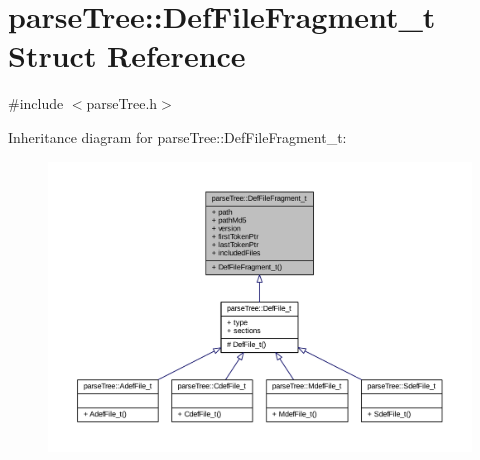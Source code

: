 \hypertarget{structparse_tree_1_1_def_file_fragment__t}{}\section{parse\+Tree\+:\+:Def\+File\+Fragment\+\_\+t Struct Reference}
\label{structparse_tree_1_1_def_file_fragment__t}


{\ttfamily \#include $<$parse\+Tree.\+h$>$}



Inheritance diagram for parse\+Tree\+:\+:Def\+File\+Fragment\+\_\+t\+:
\nopagebreak
\begin{figure}[H]
\begin{center}
\leavevmode
\includegraphics[width=350pt]{structparse_tree_1_1_def_file_fragment__t__inherit__graph}
\end{center}
\end{figure}


